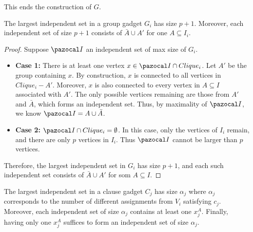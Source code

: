 \medskip

This ends the construction of $G$.

\begin{lemma}
    \label{lemma:group-gadget-indset}
    The largest independent set in a group gadget $G_i$ has size $p+1$. Moreover, each independent set of size $p+1$ consists of $\bar{A} \cup A'$ for one $A \subseteq I_i$.
\end{lemma}

\begin{proof}
    Suppose $\I$ an independent set of max size of $G_i$.
    \begin{itemize}
        \item \textbf{Case 1:} There is at least one vertex $x \in \I \cap Clique_i$. Let $A'$ be the group containing $x$. By construction, $x$ is connected to all vertices in $Clique_i - A'$. Moreover, $x$ is also connected to every vertex in $A \subseteq I$ associated with $A'$. The only possible vertices remaining are those from $A'$ and $\bar{A}$, which forms an independent set. Thus, by maximality of $\I$, we know $\I = A \cup \bar{A}$.
        \item \textbf{Case 2:} $\I \cap Clique_i = \emptyset$. In this case, only the vertices of $I_i$ remain, and there are only $p$ vertices in $I_i$. Thus $\I$ cannot be larger than $p$ vertices.
    \end{itemize}

    \medskip

    Therefore, the largest independent set in $G_i$ has size $p+1$, and each such independent set consists of $\bar{A} \cup A'$ for som $A \subseteq I$.
\end{proof}

\begin{lemma}
    \label{lemma:clause-gadget-indset}
    The largest independent set in a clause gadget $C_j$ has size $\alpha_j$ where $\alpha_j$ corresponds to the number of different assignments from $V_i$ satisfying $c_j$. Moreover, each independent set of size $\alpha_j$ contains at least one $x_j^A$. Finally, having only one $x_j^A$ suffices to form an independent set of size $\alpha_j$.
\end{lemma}

